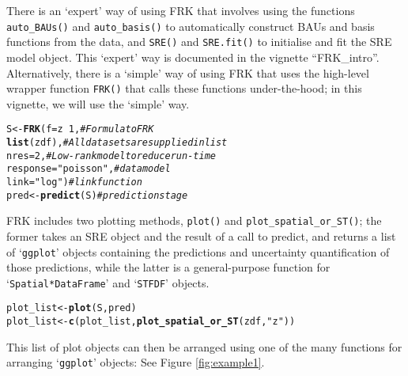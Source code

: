 \documentclass{article}\usepackage[]{graphicx}\usepackage[]{color}
\makeatletter
\newcommand{\hlnum}[1]{\textcolor[rgb]{0.686,0.059,0.569}{#1}}%
\newcommand{\hlstr}[1]{\textcolor[rgb]{0.192,0.494,0.8}{#1}}%
\newcommand{\hlcom}[1]{\textcolor[rgb]{0.678,0.584,0.686}{\textit{#1}}}%
\newcommand{\hlopt}[1]{\textcolor[rgb]{0,0,0}{#1}}%
\newcommand{\hlstd}[1]{\textcolor[rgb]{0.345,0.345,0.345}{#1}}%
\newcommand{\hlkwb}[1]{\textcolor[rgb]{0.69,0.353,0.396}{#1}}%
\newcommand{\hlkwc}[1]{\textcolor[rgb]{0.333,0.667,0.333}{#1}}%
\newcommand{\hlkwd}[1]{\textcolor[rgb]{0.737,0.353,0.396}{\textbf{#1}}}%
\newenvironment{kframe}{%
 \def\at@end@of@kframe{}%
 \ifinner\ifhmode%
  \def\at@end@of@kframe{\end{minipage}}%
  \begin{minipage}{\columnwidth}%
 \fi\fi%
 \def\FrameCommand##1{\hskip\@totalleftmargin \hskip-\fboxsep
 \colorbox{shadecolor}{##1}\hskip-\fboxsep
     \hskip-\linewidth \hskip-\@totalleftmargin \hskip\columnwidth}%
 \MakeFramed {\advance\hsize-\width
   \@totalleftmargin\z@ \linewidth\hsize
   \@setminipage}}%
 {\par\unskip\endMakeFramed%
 \at@end@of@kframe}
\newenvironment{knitrout}{}{} %
\let\code=\texttt
\newcommand{\pkg}[1]{{\fontseries{b}\selectfont #1}}
\newcommand{\class}[1]{`\code{#1}'}
\newcommand{\fct}[1]{\code{#1()}}
\makeatother
\begin{document}
There is an `expert' way of using \pkg{FRK} that involves using the functions \fct{auto\_BAUs} and \fct{auto\_basis} to automatically construct BAUs and basis functions from the data, and \fct{SRE} and \fct{SRE.fit} to initialise and fit the SRE model object. 
 This `expert' way is documented in the vignette ``FRK\_intro''.
 Alternatively, there is a `simple' way of using \pkg{FRK} that uses the high-level wrapper function \fct{FRK} that calls these functions under-the-hood; in this vignette, we will use the `simple' way.
\begin{knitrout}
\color{fgcolor}\begin{kframe}
\begin{alltt}
\hlstd{S} \hlkwb{<-} \hlkwd{FRK}\hlstd{(}\hlkwc{f} \hlstd{= z} \hlopt{~} \hlnum{1}\hlstd{,}               \hlcom{# Formula to FRK}
         \hlkwd{list}\hlstd{(zdf),}               \hlcom{# All datasets are supplied in list}
         \hlkwc{nres} \hlstd{=} \hlnum{2}\hlstd{,}                \hlcom{# Low-rank model to reduce run-time}
         \hlkwc{response} \hlstd{=} \hlstr{"poisson"}\hlstd{,}    \hlcom{# data model}
         \hlkwc{link} \hlstd{=} \hlstr{"log"}\hlstd{)}            \hlcom{# link function}
\hlstd{pred} \hlkwb{<-} \hlkwd{predict}\hlstd{(S)}                \hlcom{# prediction stage}
\end{alltt}
\end{kframe}
\end{knitrout}
\pkg{FRK} includes two plotting methods, \fct{plot} and \fct{plot\_spatial\_or\_ST}; the former takes an SRE object and the result of a call to predict, and returns a list of \class{ggplot} objects containing the predictions and uncertainty quantification of those predictions, while the latter is a general-purpose function for \class{Spatial*DataFrame} and \class{STFDF} objects.
\begin{knitrout}
\color{fgcolor}\begin{kframe}
\begin{alltt}
\hlstd{plot_list} \hlkwb{<-} \hlkwd{plot}\hlstd{(S, pred)}
\hlstd{plot_list} \hlkwb{<-} \hlkwd{c}\hlstd{(plot_list,} \hlkwd{plot_spatial_or_ST}\hlstd{(zdf,} \hlstr{"z"}\hlstd{))}
\end{alltt}
\end{kframe}
\end{knitrout}
This list of plot objects can then be arranged using one of the many functions for arranging \class{ggplot} objects: See Figure \ref{fig:example1}.
\end{document}
